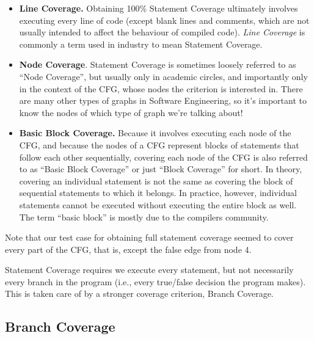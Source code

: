 \begin{itemize}
    \item {\bf Line Coverage.} Obtaining 100\% Statement Coverage ultimately
    involves executing every line of code (except blank lines and comments,
    which are not usually intended to affect the behaviour of compiled code).
    {\it Line Coverage} is commonly a term used in industry to mean Statement
    Coverage.

    \item {\bf Node Coverage}. Statement Coverage is sometimes loosely referred
    to as ``Node Coverage'', but usually only in academic circles, and
    importantly only in the context of the CFG, whose nodes the criterion is
    interested in. There are many other types of graphs in Software Engineering,
    so it's important to know the nodes of which type of graph we're talking
    about!
    
    \item {\bf Basic Block Coverage.} Because it involves executing each node of
    the CFG, and because the nodes of a CFG represent blocks of statements that
    follow each other sequentially, covering each node of the CFG is also
    referred to as ``Basic Block Coverage'' or just ``Block Coverage'' for
    short. In theory, covering an individual statement is not the same as
    covering the block of sequential statements to which it belongs. In
    practice, however, individual statements cannot be executed without
    executing the entire block as well. The term ``basic block'' is mostly due
    to the compilers community. 
\end{itemize}


Note that our test case for obtaining full statement coverage seemed to cover
every part of the CFG, that is, except the false edge from node 4. 


Statement Coverage requires we execute every statement, but not necessarily
every branch in the program (i.e., every true/false decision the program makes).
This is taken care of by a stronger coverage criterion, Branch Coverage.


\subsection{Branch Coverage} 

